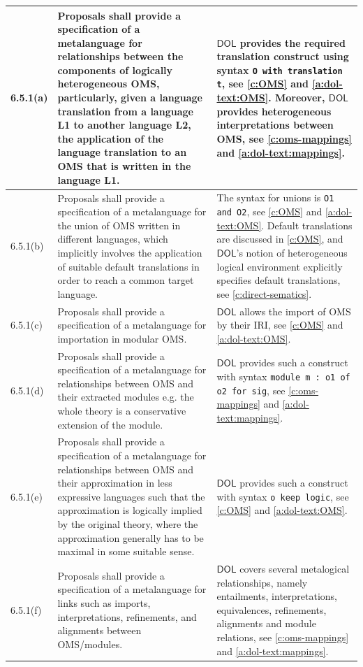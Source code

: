 \documentclass[10pt,fleqn,final]{scrreprt}
\newcommand*{\syntax}[1]{\texttt{#1}}
\newcommand*{\DOL}{\ensuremath{\mathsf{DOL}}\xspace}
\begin{document}
\begin{center}
\begin{longtable}{|p{}|p{}|p{}|}
6.5.1(a) & 
Proposals shall provide a specification of a metalanguage for relationships between the components
of logically heterogeneous OMS, particularly, given a language translation from a language L1 to
another language L2, the application of the language translation to an OMS that is written in the
language L1. &
\DOL provides the required translation construct using syntax \syntax{O with translation t}, see \ref{c:OMS} and \ref{a:dol-text:OMS}.
Moreover, \DOL provides heterogeneous interpretations between OMS, see \ref{c:oms-mappings} and \ref{a:dol-text:mappings}. 
   \\ \hline
%
6.5.1(b) & 
Proposals shall provide a specification of a metalanguage for the union of OMS written in
different languages, which implicitly involves the application of suitable default translations in
order to reach a common target language. &
The syntax for unions is \syntax{O1 and O2}, see \ref{c:OMS} and \ref{a:dol-text:OMS}. Default translations are discussed in
\ref{c:OMS}, and \DOL's notion of heterogeneous logical
environment explicitly specifies default translations, see \ref{c:direct-sematics}.
	\\ \hline
%
6.5.1(c) & 
Proposals shall provide a specification of a metalanguage for importation in modular OMS.	&
\DOL allows the import of OMS by their IRI, see \ref{c:OMS} and \ref{a:dol-text:OMS}.
	\\  \hline
%
6.5.1(d) & 
Proposals shall provide a specification of a metalanguage for relationships between OMS and their
extracted modules e.g. the whole theory is a conservative extension of the module. 	&
\DOL provides such a construct with syntax \syntax{module m : o1 of o2 for sig}, see \ref{c:oms-mappings} and \ref{a:dol-text:mappings}.
	\\ \hline
%
6.5.1(e) & 
Proposals shall provide a specification of a metalanguage for relationships between OMS and their
approximation in less expressive languages such that the approximation is logically implied by the
original theory, where the approximation generally has to be maximal in some suitable sense. 	&
\DOL provides such a construct with syntax \syntax{o keep logic},  see \ref{c:OMS} and \ref{a:dol-text:OMS}.	\\ \hline
%
6.5.1(f) & 
Proposals shall provide a specification of a metalanguage for links such as imports,
interpretations, refinements, and alignments between OMS/modules.
	&
\DOL covers several metalogical relationships, namely entailments, interpretations, equivalences, refinements, alignments and module relations, see \ref{c:oms-mappings} and \ref{a:dol-text:mappings}.

\end{longtable}
\end{center}
\end{document}
